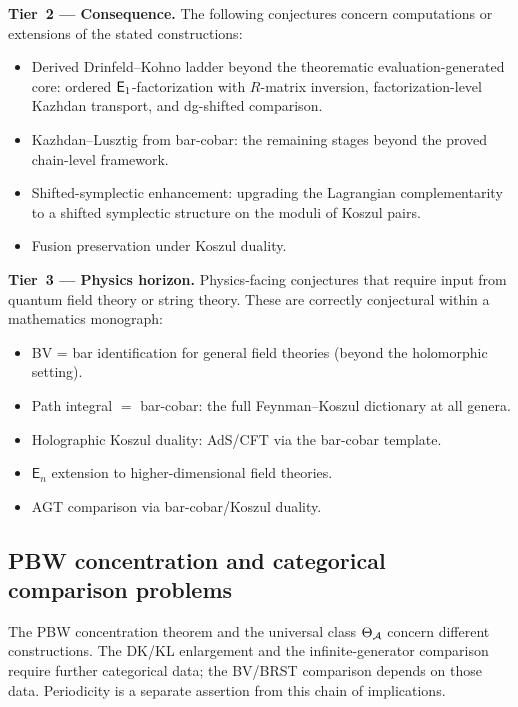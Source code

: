 \smallskip\noindent\textbf{Tier~2 --- Consequence.}
The following conjectures concern computations or extensions of the stated constructions:
\begin{itemize}
\item Derived Drinfeld--Kohno ladder beyond the theorematic
  evaluation-generated core:
  ordered $\mathsf{E}_1$-factorization with $R$-matrix inversion,
  factorization-level Kazhdan transport, and dg-shifted comparison.
\item Kazhdan--Lusztig from bar-cobar: the remaining stages
  beyond the proved chain-level framework.
\item Shifted-symplectic enhancement: upgrading the Lagrangian
  complementarity to a shifted symplectic structure on the
  moduli of Koszul pairs.
\item Fusion preservation under Koszul duality.
\end{itemize}

\smallskip\noindent\textbf{Tier~3 --- Physics horizon.}
Physics-facing conjectures that require input from quantum field
theory or string theory.  These are correctly conjectural within
a mathematics monograph:
\begin{itemize}
\item BV = bar identification for general field theories
  (beyond the holomorphic setting).
\item Path integral $=$ bar-cobar: the full Feynman--Koszul
  dictionary at all genera.
\item Holographic Koszul duality: AdS/CFT via the bar-cobar template.
\item $\mathsf{E}_n$ extension to higher-dimensional field theories.
\item AGT comparison via bar-cobar/Koszul duality.
\end{itemize}

\subsection{PBW concentration and categorical comparison problems}
\label{subsec:five-master-conjectures}

The PBW concentration theorem and the universal class $\Theta_{\mathcal{A}}$ concern
different constructions.  The DK/KL enlargement and the infinite-generator comparison
require further categorical data; the BV/BRST comparison depends on those data.
Periodicity is a separate assertion from this chain of implications.

